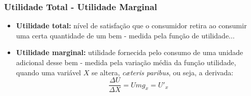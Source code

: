 \begin{frame}
	\frametitle{Utilidade Total - Utilidade Marginal}

	\begin{itemize}
		\item<1-> \textbf{Utilidade total:} n\'ivel de satisfa\c c\~ao que o consumidor retira ao consumir uma certa quantidade de um bem - medida pela fun\c c\~ao de utilidade...
		\item<2-> \textbf{Utilidade marginal:} utilidade fornecida pelo consumo de uma unidade adicional desse bem
			- medida pela varia\c c\~ao m\'edia da fun\c c\~ao utilidade, quando uma vari\'avel $X$ se altera, \emph{c\ae teris paribus}, ou seja, a derivada:  $$\frac{\Delta U}{\Delta X} = Umg_{x}=U'_{x}$$
	\end{itemize}
\end{frame}

